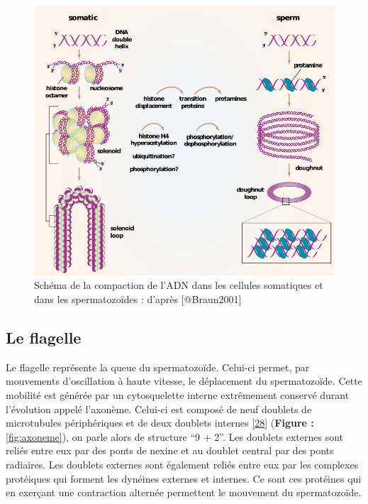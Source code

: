 \documentclass[12pt,twoside]{ugathesis}
\theoremstyle{definition}
\theoremstyle{definition}
\theoremstyle{remark}
\begin{document}
\newpage

\begin{figure}

{\centering \includegraphics[scale=.55]{figure/noyau} 

}

\caption[Schéma de la compaction de l’ADN dans les cellules somatiques et dans les spermatozoïdes]{Schéma de la compaction de l’ADN dans les cellules somatiques et dans les spermatozoïdes : d'après [@Braun2001]}\label{fig:noyau}
\end{figure}

\newpage

\subsection{Le flagelle}\label{le-flagelle}

Le flagelle représente la queue du spermatozoïde. Celui-ci permet, par
mouvements d'oscillation à haute vitesse, le déplacement du
spermatozoïde. Cette mobilité est générée par un cytosquelette interne
extrêmement conservé durant l'évolution appelé l'axonème. Celui-ci est
composé de neuf doublets de microtubules périphériques et de deux
doublets internes {[}\protect\hyperlink{ref-Inaba2003}{28}{]}
(\textbf{Figure : }\ref{fig:axoneme}), on parle alors de structure ``9 +
2''. Les doublets externes sont reliés entre eux par des ponts de nexine
et au doublet central par des ponts radiaires. Les doublets externes
sont également reliés entre eux par les complexes protéiques qui forment
les dynéines externes et internes. Ce sont ces protéines qui en exerçant
une contraction alternée permettent le mouvement du spermatozoïde.
\end{document}
